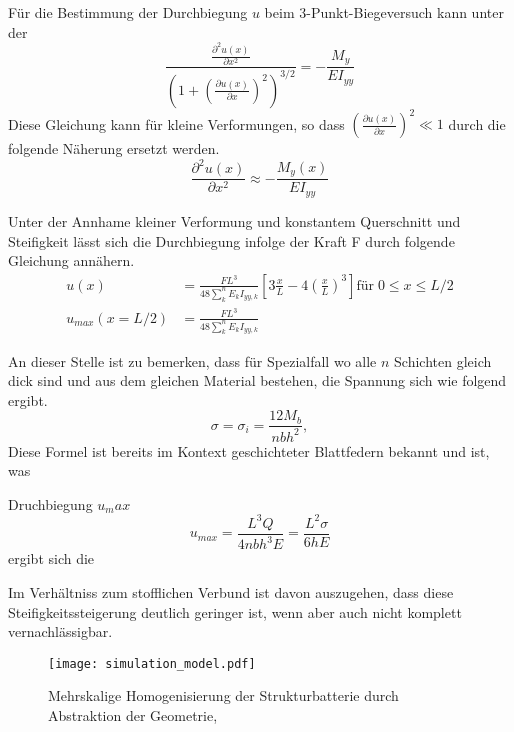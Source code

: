 Für die Bestimmung der Durchbiegung $u$ beim 3-Punkt-Biegeversuch kann 
unter der
\begin{equation}
\frac{\frac{\partial^2 u(x)}{\partial x^2}}{\left(1 + \left(\frac{\partial u(x)}{\partial x} \right)^2 \right)^{3/2}} = -\frac{M_y}{E I_{yy}}
\end{equation}
Diese Gleichung kann für kleine Verformungen, so dass $(\frac{\partial u(x)}{\partial x})^2 \ll 1$ durch die folgende Näherung ersetzt werden.
\begin{equation}
    \frac{\partial^2 u(x)}{\partial x^2} \approx -\frac{M_y(x)}{E I_{yy}}
\end{equation}

Unter der Annhame kleiner Verformung und konstantem Querschnitt und Steifigkeit lässt sich die Durchbiegung infolge der Kraft F durch folgende Gleichung annähern.
\begin{align}
    u(x) &= \frac{F L^3}{48 \sum_{k}^{n} E_k I_{yy,k}} \left[ 3 \frac{x}{L} - 4\left(\frac{x}{L}\right)^3 \right] \text{für} \; 0 \leq x \leq L/2 \\
    u_{max} (x = L/2) &= \frac{FL^3}{48 \sum_{k}^{n} E_k I_{yy,k}} 
\end{align}



An dieser Stelle ist zu bemerken, dass für Spezialfall wo alle $n$ Schichten gleich dick sind und aus dem gleichen Material bestehen, die Spannung sich wie folgend ergibt.
\begin{equation}
    \sigma = \sigma_i = \frac{12 M_{b}}{n b h^2},
\end{equation}
Diese Formel ist bereits im Kontext geschichteter Blattfedern bekannt und ist, was 

Druchbiegung $u_max$
\begin{equation}
    u_{max} = \frac{L^3 Q}{4 n b h^3 E} = \frac{L^2 \sigma}{6 h E}
\end{equation}
ergibt sich die 


Im Verhältniss zum stofflichen Verbund ist davon auszugehen, dass diese Steifigkeitssteigerung deutlich geringer ist, wenn aber auch nicht komplett vernachlässigbar.

\begin{figure}[!h]
        \center
		\texttt{[image: simulation\_model.pdf]}
		\caption{\label{fig:homogenisation}Mehrskalige Homogenisierung der Strukturbatterie durch Abstraktion der Geometrie, }
\end{figure}

